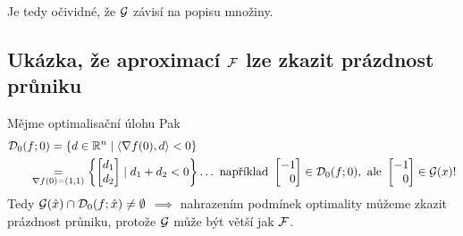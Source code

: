 Je tedy očividné, že $\mathcal{G}$ závisí na popisu množiny.

\subsection{Ukázka, že aproximací \texorpdfstring{$\mathcal{F}$}{F} lze zkazit prázdnost průniku}
Mějme optimalisační úlohu
Pak
\begin{align*}
    \mathcal{D}_0(f; 0) &= \left\lbrace d \in \mathbb{R}^n \mid \langle \nabla f(0), d\rangle < 0 \right\rbrace \\
    &\hspace*{-1.8em}\underset{\nabla f(0) = (1, 1)}{=} \left\lbrace 
    \begin{bmatrix}
        d_1 \\
        d_2
    \end{bmatrix} \mid d_1 + d_2 < 0 \right\rbrace \dots \text{ například } 
    \begin{bmatrix}
        -1 \\
        \phantom{-}0
    \end{bmatrix} \in \mathcal{D}_0(f; 0), \text{ ale } 
    \begin{bmatrix}
        -1 \\
        \phantom{-}0
    \end{bmatrix} \in \mathcal{G}(x)!
\end{align*}
Tedy $\mathcal{G}(\hat x) \cap \mathcal{D}_0(f; \hat x) \not= \emptyset$ $\implies$ nahrazením podmínek optimality můžeme zkazit prázdnost 
průniku, protože $\mathcal{G}$ může být větší jak $\mathcal{F}$.
